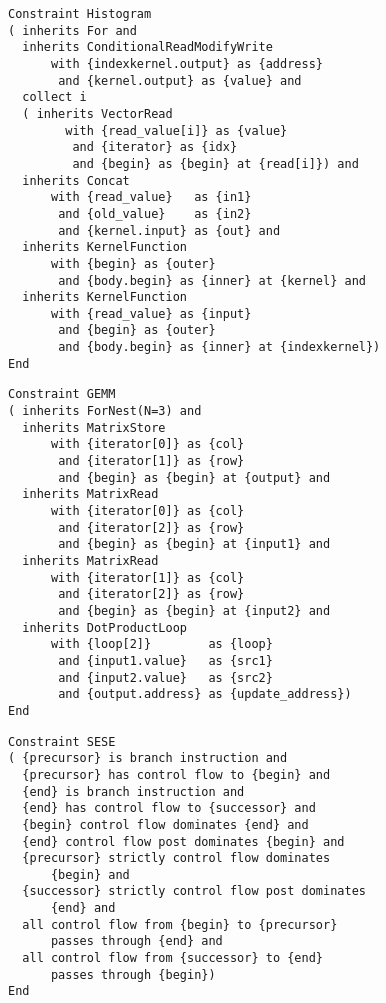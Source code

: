 \begin{figure}[p]
\begin{lstlisting}[language=IDL,
                   label={fig:histogram},caption=
   {IDL specification of generalized histogram}]
Constraint Histogram
( inherits For and
  inherits ConditionalReadModifyWrite
      with {indexkernel.output} as {address}
       and {kernel.output} as {value} and
  collect i
  ( inherits VectorRead
        with {read_value[i]} as {value}
         and {iterator} as {idx}
         and {begin} as {begin} at {read[i]}) and
  inherits Concat
      with {read_value}   as {in1}
       and {old_value}    as {in2}
       and {kernel.input} as {out} and
  inherits KernelFunction
      with {begin} as {outer}
       and {body.begin} as {inner} at {kernel} and
  inherits KernelFunction
      with {read_value} as {input}
       and {begin} as {outer}
       and {body.begin} as {inner} at {indexkernel})
End
\end{lstlisting}
\end{figure}

\begin{figure}[p]
\begin{lstlisting}[language=IDL,
                   label={fig:gemm},caption={IDL specification of GEMM}]
Constraint GEMM
( inherits ForNest(N=3) and
  inherits MatrixStore
      with {iterator[0]} as {col}
       and {iterator[1]} as {row}
       and {begin} as {begin} at {output} and
  inherits MatrixRead
      with {iterator[0]} as {col}
       and {iterator[2]} as {row}
       and {begin} as {begin} at {input1} and
  inherits MatrixRead
      with {iterator[1]} as {col}
       and {iterator[2]} as {row}
       and {begin} as {begin} at {input2} and
  inherits DotProductLoop
      with {loop[2]}        as {loop}
       and {input1.value}   as {src1}
       and {input2.value}   as {src2}
       and {output.address} as {update_address})
End
\end{lstlisting}
\end{figure}

\begin{figure}[p]
\begin{lstlisting}[language=IDL,
                   label={fig:sese},caption={IDL specification of SESE region}]
Constraint SESE
( {precursor} is branch instruction and
  {precursor} has control flow to {begin} and
  {end} is branch instruction and
  {end} has control flow to {successor} and
  {begin} control flow dominates {end} and
  {end} control flow post dominates {begin} and
  {precursor} strictly control flow dominates
      {begin} and
  {successor} strictly control flow post dominates
      {end} and
  all control flow from {begin} to {precursor}
      passes through {end} and
  all control flow from {successor} to {end}
      passes through {begin})
End
\end{lstlisting}
\end{figure}

